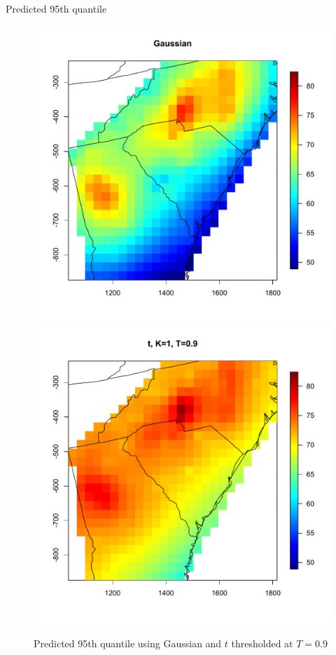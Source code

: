 \documentclass{beamer}
\begin{document}
\begin{frame}{Predicted 95th quantile}
\centering
\begin{figure}
    \includegraphics[width=.5\linewidth]{./plots/quantile-95-gau.pdf}
    \includegraphics[width=.5\linewidth]{./plots/quantile-95-t19.pdf}
    \caption{Predicted 95th quantile using Gaussian and $t$ thresholded at $T=0.9$}
\end{figure}
\end{frame}
\end{document}
